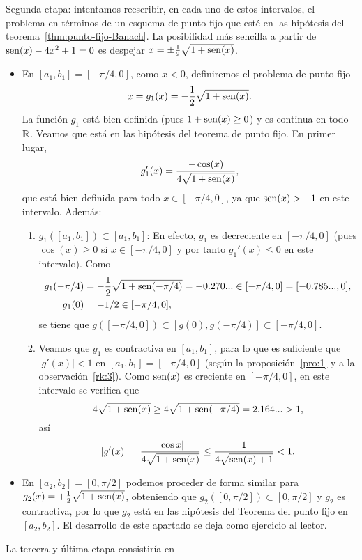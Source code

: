 \begin{example}
  \textsf{Segunda etapa}: intentamos reescribir, en cada uno de
  estos intervalos, el problema en términos de un esquema de punto
  fijo que esté en las hipótesis del teorema~\ref{thm:punto-fijo-Banach}. La
  posibilidad más sencilla a partir de $\operatorname{sen}(x)-4x^2+1=0$ es despejar
  $x=\pm \frac 12 \sqrt{1+\operatorname{sen}(x)}$.
  \begin{itemize}
  \item En $[a_1,b_1]=[-\pi/4, 0]$, como $x<0$, definiremos el
    problema de punto fijo
  $$
  x=g_1(x)=-\dfrac 12 \sqrt{1+\operatorname{sen}(x)}.
  $$
  La función $g_1$ está bien definida (pues $1+\operatorname{sen}(x)\ge 0$) y es
  continua en todo $\operatorname{{\mathbb R}}$. Veamos que está en las hipótesis del
  teorema de punto fijo. En primer lugar,
  $$
  g_1'(x)=\frac{-\cos(x)}{4\sqrt{1+\operatorname{sen}(x)}},
  $$
  que está bien definida para todo $x\in[-\pi/4, 0]$, ya que
  $\operatorname{sen}(x)>-1$ en este intervalo. Además:
  \begin{enumerate}
  \item $g_1([a_1,b_1])\subset [a_1,b_1]$: En efecto, $g_1$ es
    decreciente en $[-\pi/4,0]$ (pues $\cos(x)\ge 0$ si $x\in
    [-\pi/4, 0]$ y por tanto $g_1'(x)\le 0$ en este intervalo). 
    Como
    \begin{align*}
      g_1(-\pi/4)&= -\frac12 \sqrt{1+\operatorname{sen}(-\pi/4)}=-0.270...\in
      [-\pi/4,0]=[-0.785...,0],
      \\
      g_1(0)&=-1/2 \in [-\pi/4,0], 
    \end{align*}
    se tiene que $g([-\pi/4,0])\subset
    [g(0),g(-\pi/4)] \subset [-\pi/4,0]$.
  \item Veamos que $g_1$ es contractiva en $[a_1,b_1]$, para lo que es
    suficiente que $|g'(x)|<1$ en $[a_1,b_1]=[-\pi/4,0]$ (según la
    proposición~\ref{pro:1} y a la observación~\ref{rk:3}).  Como
    $\operatorname{sen}(x)$ es creciente en $[-\pi/4,0]$, en este intervalo se
    verifica que
    $$4\sqrt{1+\operatorname{sen}(x)}\ge 4\sqrt{1+\operatorname{sen}(-\pi/4)}=2.164... >1,$$ 
    así
    $$
    \left|g'(x)\right| = \frac{|\cos{x}|}{4\sqrt{1+\operatorname{sen}(x)}} \le
    \frac{1}{4\sqrt{\operatorname{sen}(x)+1}} < 1.
    $$
  \end{enumerate}
\item En $[a_2,b_2]=[0,\pi/2]$ podemos proceder de forma similar para
  $g_2(x)=+\frac 12 \sqrt{1+\operatorname{sen}(x)}$, obteniendo que
  $g_2([0,\pi/2])\subset[0,\pi/2]$ y $g_2$ es contractiva, por lo que
  $g_2$ está en las hipótesis del Teorema del punto fijo en
  $[a_2,b_2]$. El desarrollo de este apartado se deja como ejercicio
  al lector.
  \end{itemize}
  La \textsf{tercera y última etapa} consistiría en

\end{example}
